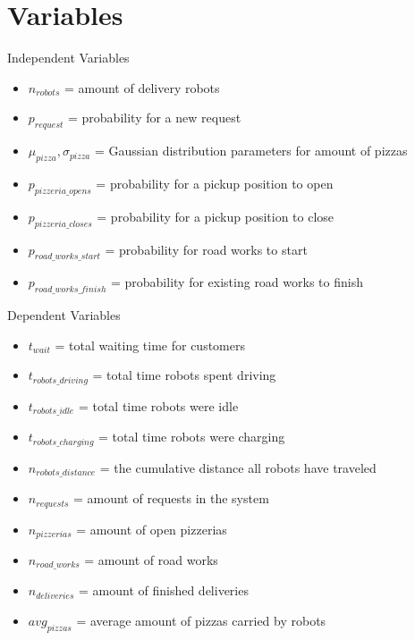 \section{Variables}
\begin{frame}{Independent Variables}
    \begin{itemize}
        \item $n_{robots}$ = amount of delivery robots
        \item $p_{request}$ = probability for a new request
        \item $\mu_{pizza}, \sigma_{pizza}$ = Gaussian distribution parameters for amount of pizzas
        \item $p_{pizzeria\_opens}$  = probability for a pickup position to open
        \item $p_{pizzeria\_closes}$ = probability for a pickup position to close
        \item $p_{road\_works\_start}$ = probability for road works to start
        \item $p_{road\_works\_finish}$ = probability for existing road works to finish
    \end{itemize}
\end{frame}

\begin{frame}{Dependent Variables}
    \begin{itemize}
        \item $t_{wait}$ = total waiting time for customers                             %
        \item $t_{robots\_driving}$ = total time robots spent driving                   %
        \item $t_{robots\_idle}$ = total time robots were idle                          %
        \item $t_{robots\_charging}$ = total time robots were charging                  %
        \item $n_{robots\_distance}$ = the cumulative distance all robots have traveled %
        \item $n_{requests}$ = amount of requests in the system                         %
        \item $n_{pizzerias}$ = amount of open pizzerias                                %
        \item $n_{road\_works}$ = amount of road works                                  %
        \item $n_{deliveries}$ = amount of finished deliveries                          %
        \item $avg_{pizzas}$ = average amount of pizzas carried by robots               %
    \end{itemize}
\end{frame}

